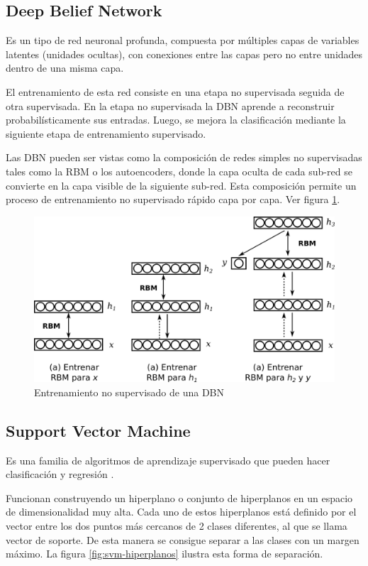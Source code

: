 \subsection{Deep Belief Network}

Es un tipo de red neuronal profunda, compuesta por múltiples capas de variables latentes (unidades ocultas), con conexiones entre las capas pero no entre unidades dentro de una misma capa.

El entrenamiento de esta red consiste en una etapa no supervisada seguida de otra supervisada. En la etapa no supervisada la \ac{DBN} aprende a reconstruir probabilísticamente sus entradas. Luego, se mejora la clasificación mediante la siguiente etapa de entrenamiento supervisado.

Las \ac{DBN} pueden ser vistas como la composición de redes simples no supervisadas tales como la \ac{RBM} o los autoencoders, donde la capa oculta de cada sub-red se convierte en la capa visible de la siguiente sub-red. Esta composición permite un proceso de entrenamiento no supervisado rápido capa por capa. Ver figura \ref{fig:dbn-train}.

\begin{figure}[htbp]
	\centering
	\includegraphics[width=0.9\linewidth]{graficos/propios/entrenamiento_dbn.png}
	\caption{Entrenamiento no supervisado de una DBN \citep{beysolow2017autoencoders}}
	\label{fig:dbn-train}
\end{figure}

\subsection{Support Vector Machine}

Es una familia de algoritmos de aprendizaje supervisado que pueden hacer clasificación y regresión \citep{cortes1995support}.

Funcionan construyendo un hiperplano o conjunto de hiperplanos en un espacio de dimensionalidad muy alta. Cada uno de estos hiperplanos está definido por el vector entre los dos puntos más cercanos de 2 clases diferentes, al que se llama vector de soporte. De esta manera se consigue separar a las clases con un margen máximo. La figura \ref{fig:svm-hiperplanos} ilustra esta forma de separación.

